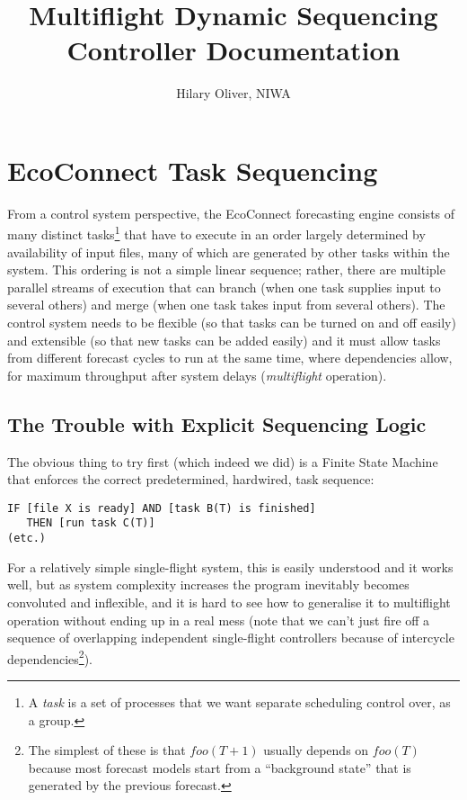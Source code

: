 \documentclass[a4paper,12pt]{amsart}
\title{Multiflight Dynamic Sequencing Controller Documentation}
\author{Hilary Oliver, NIWA}
\begin{document}
\maketitle

\section{EcoConnect Task Sequencing} 

From a control system perspective, the EcoConnect forecasting engine
consists of many distinct tasks\footnote{A {\em task} is a set of
processes that we want separate scheduling control over, as a group.}
that have to execute in an order largely determined by availability of
input files, many of which are generated by other tasks within the
system. This ordering is not a simple linear sequence; rather, there are
multiple parallel streams of execution that can branch (when one task
supplies input to several others) and merge (when one task takes input
from several others). The control system needs to be flexible (so that
tasks can be turned on and off easily) and extensible (so that new tasks
can be added easily) and it must allow tasks from different forecast
cycles to run at the same time, where dependencies allow, for maximum
throughput after system delays ({\em multiflight} operation). 


\subsection{The Trouble with Explicit Sequencing Logic}

The obvious thing to try first (which indeed we did) is a Finite State
Machine that enforces the correct predetermined, hardwired, task
sequence: 

\begin{verbatim}
IF [file X is ready] AND [task B(T) is finished]
   THEN [run task C(T)] 
(etc.)
\end{verbatim} 

For a relatively simple single-flight system, this is easily understood
and it works well, but as system complexity increases the program
inevitably becomes convoluted and inflexible, and it is hard to see how
to generalise it to multiflight operation without ending up in a real
mess (note that we can't just fire off a sequence of overlapping
independent single-flight controllers because of intercycle
dependencies\footnote{The simplest of these is that $foo(T+1)$ usually
depends on $foo(T)$ because most forecast models start from a
``background state'' that is generated by the previous forecast.}). 
\end{document}
